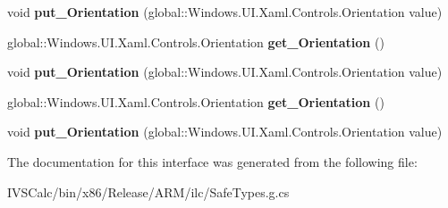 \begin{DoxyCompactItemize}
\item 
\mbox{\label{interface_windows_1_1_u_i_1_1_xaml_1_1_controls_1_1_i_stack_panel_aa44510136b6a8513057ad0c1c94f762a}} 
void {\bfseries put\+\_\+\+Orientation} (global\+::\+Windows.\+U\+I.\+Xaml.\+Controls.\+Orientation value)
\item 
\mbox{\label{interface_windows_1_1_u_i_1_1_xaml_1_1_controls_1_1_i_stack_panel_aa54fbfc47c3011f5d19aca4449f62728}} 
global\+::\+Windows.\+U\+I.\+Xaml.\+Controls.\+Orientation {\bfseries get\+\_\+\+Orientation} ()
\item 
\mbox{\label{interface_windows_1_1_u_i_1_1_xaml_1_1_controls_1_1_i_stack_panel_aa44510136b6a8513057ad0c1c94f762a}} 
void {\bfseries put\+\_\+\+Orientation} (global\+::\+Windows.\+U\+I.\+Xaml.\+Controls.\+Orientation value)
\item 
\mbox{\label{interface_windows_1_1_u_i_1_1_xaml_1_1_controls_1_1_i_stack_panel_aa54fbfc47c3011f5d19aca4449f62728}} 
global\+::\+Windows.\+U\+I.\+Xaml.\+Controls.\+Orientation {\bfseries get\+\_\+\+Orientation} ()
\item 
\mbox{\label{interface_windows_1_1_u_i_1_1_xaml_1_1_controls_1_1_i_stack_panel_aa44510136b6a8513057ad0c1c94f762a}} 
void {\bfseries put\+\_\+\+Orientation} (global\+::\+Windows.\+U\+I.\+Xaml.\+Controls.\+Orientation value)
\end{DoxyCompactItemize}


The documentation for this interface was generated from the following file\+:\begin{DoxyCompactItemize}
\item 
I\+V\+S\+Calc/bin/x86/\+Release/\+A\+R\+M/ilc/Safe\+Types.\+g.\+cs\end{DoxyCompactItemize}
